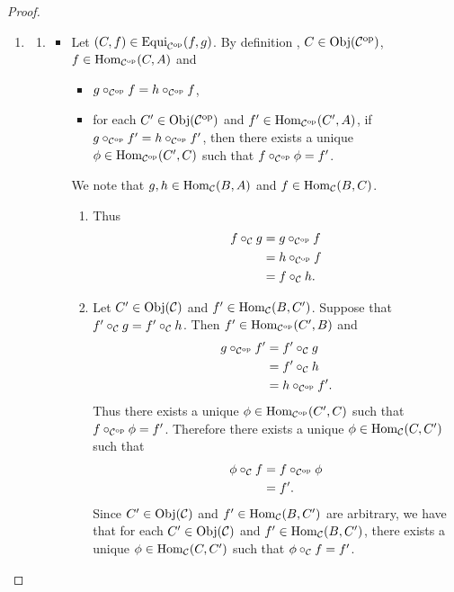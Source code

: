 \documentclass{book}
\begin{document}
	\begin{proof}\
		\begin{enumerate}
			\item 
			\begin{enumerate}
				\item 
				\begin{itemize}
					\item Let $(C,f) \in \operatorname{Equi}_{{\mathcal{C}}^{\text{op}}}(f,g)$. By definition , $C \in \operatorname{Obj}({\mathcal{C}}^{\text{op}})$, $f \in \operatorname{Hom}_{{\mathcal{C}}^{\text{op}}}(C, A)$ and
					\begin{itemize}
						\item $g \circ_{{\mathcal{C}}^{\text{op}}} f = h \circ_{{\mathcal{C}}^{\text{op}}} f$,
						\item for each $C' \in \operatorname{Obj}({\mathcal{C}}^{\text{op}})$ and $f' \in \operatorname{Hom}_{{\mathcal{C}}^{\text{op}}}(C', A)$, if $g \circ_{{\mathcal{C}}^{\text{op}}} f' = h \circ_{{\mathcal{C}}^{\text{op}}} f'$, then there exists a unique $\phi \in \operatorname{Hom}_{{\mathcal{C}}^{\text{op}}}(C', C)$ such that $f \circ_{{\mathcal{C}}^{\text{op}}} \phi = f'$. 
					\end{itemize}
					We note that $g,h \in \operatorname{Hom}_{\mathcal{C}}(B, A)$ and $f \in \operatorname{Hom}_{\mathcal{C}}(B, C)$.  
					\begin{enumerate}
						\item Thus
						\begin{align*}
							f \circ_{\mathcal{C}} g 
							& = g \circ_{{\mathcal{C}}^{\text{op}}} f \\
							& = h \circ_{{\mathcal{C}}^{\text{op}}} f \\
							& = f \circ_{\mathcal{C}} h.
						\end{align*}
						\item Let $C' \in \operatorname{Obj}(\mathcal{C})$ and $f' \in \operatorname{Hom}_{\mathcal{C}}(B, C')$. Suppose that $f' \circ_{\mathcal{C}} g = f' \circ_{\mathcal{C}} h$. Then $f' \in \operatorname{Hom}_{{\mathcal{C}}^{\text{op}}}(C', B)$ and  
						\begin{align*}
							g \circ_{{\mathcal{C}}^{\text{op}}} f' 
							& = f' \circ_{\mathcal{C}} g \\
							& = f' \circ_{\mathcal{C}} h \\
							& = h \circ_{{\mathcal{C}}^{\text{op}}} f'.
						\end{align*}
						Thus there exists a unique $\phi \in \operatorname{Hom}_{{\mathcal{C}}^{\text{op}}}(C', C)$ such that $f \circ_{{\mathcal{C}}^{\text{op}}} \phi = f'$. Therefore there exists a unique $\phi \in \operatorname{Hom}_{\mathcal{C}}(C, C')$ such that 
						\begin{align*}
							\phi \circ_{\mathcal{C}} f 
							& = f \circ_{{\mathcal{C}}^{\text{op}}} \phi \\
							& = f'.
						\end{align*}
						Since $C' \in \operatorname{Obj}(\mathcal{C})$ and $f' \in \operatorname{Hom}_{\mathcal{C}}(B, C')$ are arbitrary, we have that for each $C' \in \operatorname{Obj}(\mathcal{C})$ and $f' \in \operatorname{Hom}_{\mathcal{C}}(B, C')$, there exists a unique $\phi \in \operatorname{Hom}_{\mathcal{C}}(C, C')$ such that $\phi \circ_{\mathcal{C}} f = f'$.

\end{enumerate}
\end{itemize}
\end{enumerate}
\end{enumerate}
\end{proof}
\end{document}
